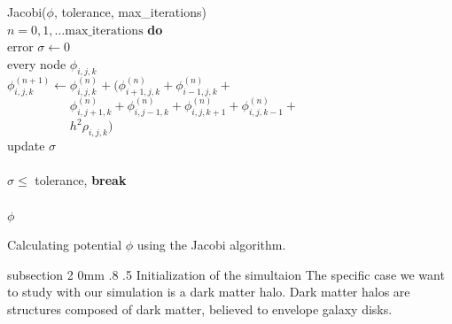 \documentclass[notitlepage, 12pt]{article}
\makeatletter
\renewcommand{\subsection}{\@startsection    %
        {subsection}
        {2}
        {0mm}
        {.8\baselineskip}
        {.5\baselineskip}
        {\bfseries\normalsize}}
\makeatother
\begin{document}
\begin{algorithm}[H]
\hspace{0.1\textwidth}\parbox{.8\textwidth}{
\-\hspace{0ex}{\bf function} Jacobi($\phi$, tolerance, max\_iterations)\\
\-\hspace{4ex}{\bf for} $n = 0,1,\ldots\mbox{max\_iterations}$ {\bf do}\\
\-\hspace{8ex}error $\sigma\leftarrow 0$\\
\-\hspace{8ex}{\bf for} every node $\phi_{i,j,k}$\\
\-\hspace{12ex}$\phi_{i,j,k}^{(n+1)} \leftarrow \phi_{i,j,k}^{(n)} + (\phi_{i+1,j,k}^{(n)} +\phi_{i-1,j,k}^{(n)}+$\\
\-\hspace{12ex}$\phantom{\phi_{i,j,k}^{(n+1)} \leftarrow }\phi_{i,j+1,k}^{(n)}+ \phi_{i,j-1,k}^{(n)} + \phi_{i,j,k+1}^{(n)} + \phi_{i,j,k-1}^{(n)} +$\\
\-\hspace{12ex}$\phantom{\phi_{i,j,k}^{(n+1)} \leftarrow} h^2\rho_{i,j,k})$\\
\-\hspace{12ex}update $\sigma$\\
\-\hspace{8ex}{\bf end for}\\
\-\hspace{8ex}{\bf if} $\sigma \leq $ tolerance, {\bf break}\\
\-\hspace{4ex}{\bf end for}\\
\-\hspace{4ex}{\bf return} $\phi$\\
\-\hspace{0ex}{\bf end function}}
\caption{Calculating potential $\phi$ using the Jacobi algorithm.}
\label{alg:Jacobi}
\end{algorithm}




\subsection{Initialization of the simultaion}
The specific case we want to study with our simulation is a dark matter halo. Dark matter halos are structures composed of dark matter, believed to envelope galaxy disks.
\end{document}
